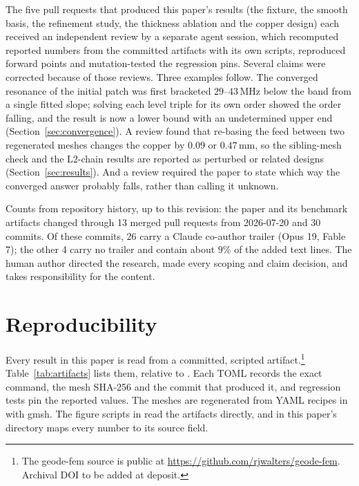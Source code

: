 \documentclass{anvil-paper}
\begin{document}
The five pull requests that produced this paper's results (the fixture,
the smooth basis, the refinement study, the thickness ablation and the
copper design) each received an independent review by a separate agent
session, which recomputed reported numbers from the committed artifacts
with its own scripts, reproduced forward points and mutation-tested the
regression pins. Several claims were corrected because of those reviews.
Three examples follow. The converged resonance of the initial patch was
first bracketed $29$--$43$\,MHz below the band from a single fitted slope;
solving each level triple for its own order showed the order falling, and
the result is now a lower bound with an undetermined upper end
(Section~\ref{sec:convergence}). A review found that re-basing the feed
between two regenerated meshes changes the copper by $0.09$ or $0.47$\,mm,
so the sibling-mesh check and the L2-chain results are reported as
perturbed or related designs (Section~\ref{sec:results}). And a review
required the paper to state which way the converged answer probably falls,
rather than calling it unknown.

Counts from repository history, up to this revision: the paper and its
benchmark artifacts changed through 13 merged pull requests from
2026-07-20 and 30 commits. Of these commits, 26 carry a Claude co-author
trailer (Opus 19, Fable 7); the other 4 carry no trailer and contain about
$9\%$ of the added text lines. The human author directed the research,
made every scoping and claim decision, and takes responsibility for the
content.

\section{Reproducibility}
\label{sec:repro}

Every result in this paper is read from a committed, scripted
artifact.\footnote{The geode-fem source is public at
\url{https://github.com/rjwalters/geode-fem}. Archival DOI to be added at
deposit.}
Table~\ref{tab:artifacts} lists them, relative to
. Each TOML records the exact
command, the mesh SHA-256 and the commit that produced it, and regression
tests pin the reported values. The meshes are regenerated from YAML
recipes in  with gmsh. The figure scripts in
 read the artifacts directly, and 
in this paper's directory maps every number to its source field.
\end{document}
